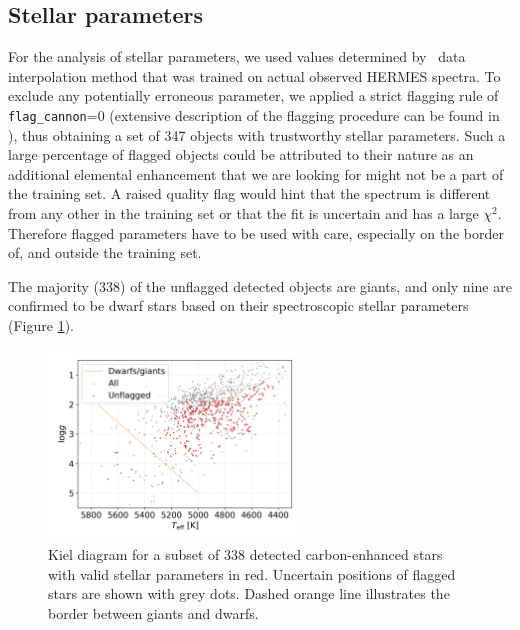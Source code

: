 \subsection{Stellar parameters}
\label{sec:cannon_params}
For the analysis of stellar parameters, we used values determined by \TC\ data interpolation method that was trained on actual observed HERMES spectra. To exclude any potentially erroneous parameter, we applied a strict flagging rule of \texttt{flag\_cannon}=0 (extensive description of the flagging procedure can be found in \citet{buder2018}), thus obtaining a set of 347 objects with trustworthy stellar parameters. Such a large percentage of flagged objects could be attributed to their nature as an additional elemental enhancement that we are looking for might not be a part of the training set. A raised quality flag would hint that the spectrum is different from any other in the training set or that the fit is uncertain and has a large $\chi^2$. Therefore flagged parameters have to be used with care, especially on the border of, and outside the training set.

The majority (338) of the unflagged detected objects are giants, and only nine are confirmed to be dwarf stars based on their spectroscopic stellar parameters (Figure \ref{fig:kiel_plot}).

\begin{figure}
	\centering
	\includegraphics[width=0.6\textwidth]{Kiel_diagram.png}
	\caption{Kiel diagram for a subset of 338 detected carbon-enhanced stars with valid stellar parameters in red. Uncertain positions of flagged stars are shown with grey dots. Dashed orange line illustrates the border between giants and dwarfs.}
	\label{fig:kiel_plot}
\end{figure}

